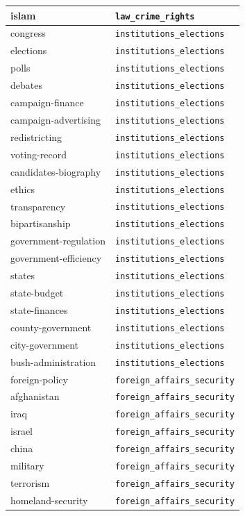 \begin{longtable}{ll}
islam & \texttt{law\_crime\_rights} \\
\midrule
congress & \texttt{institutions\_elections} \\
elections & \texttt{institutions\_elections} \\
polls & \texttt{institutions\_elections} \\
debates & \texttt{institutions\_elections} \\
campaign-finance & \texttt{institutions\_elections} \\
campaign-advertising & \texttt{institutions\_elections} \\
redistricting & \texttt{institutions\_elections} \\
voting-record & \texttt{institutions\_elections} \\
candidates-biography & \texttt{institutions\_elections} \\
ethics & \texttt{institutions\_elections} \\
transparency & \texttt{institutions\_elections} \\
bipartisanship & \texttt{institutions\_elections} \\
government-regulation & \texttt{institutions\_elections} \\
government-efficiency & \texttt{institutions\_elections} \\
states & \texttt{institutions\_elections} \\
state-budget & \texttt{institutions\_elections} \\
state-finances & \texttt{institutions\_elections} \\
county-government & \texttt{institutions\_elections} \\
city-government & \texttt{institutions\_elections} \\
bush-administration & \texttt{institutions\_elections} \\
\midrule
foreign-policy & \texttt{foreign\_affairs\_security} \\
afghanistan & \texttt{foreign\_affairs\_security} \\
iraq & \texttt{foreign\_affairs\_security} \\
israel & \texttt{foreign\_affairs\_security} \\
china & \texttt{foreign\_affairs\_security} \\
military & \texttt{foreign\_affairs\_security} \\
terrorism & \texttt{foreign\_affairs\_security} \\
homeland-security & \texttt{foreign\_affairs\_security} \\

\end{longtable}
